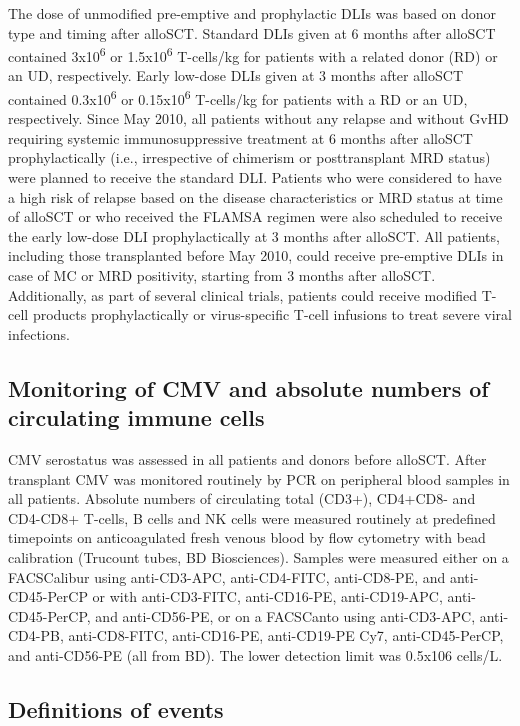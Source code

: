 \documentclass[
  letterpaper,
  paper=240mm:170mm,
  twoside=true,
  open=right,
  fontsize=10pt,
  pagesize=false,
  BCOR=15mm,
  DIV=14,
  headinclude=true,
  footinclude=false,
  headsepline=on]{scrbook}
\begin{document}
The dose of unmodified pre-emptive and prophylactic DLIs was based on
donor type and timing after alloSCT. Standard DLIs given at 6 months
after alloSCT contained 3x10\textsuperscript{6} or
1.5x10\textsuperscript{6} T-cells/kg for patients with a related donor
(RD) or an UD, respectively. Early low-dose DLIs given at 3 months after
alloSCT contained 0.3x10\textsuperscript{6} or
0.15x10\textsuperscript{6} T-cells/kg for patients with a RD or an UD,
respectively. Since May 2010, all patients without any relapse and
without GvHD requiring systemic immunosuppressive treatment at 6 months
after alloSCT prophylactically (i.e., irrespective of chimerism or
posttransplant MRD status) were planned to receive the standard DLI.
Patients who were considered to have a high risk of relapse based on the
disease characteristics or MRD status at time of alloSCT or who received
the FLAMSA regimen were also scheduled to receive the early low-dose DLI
prophylactically at 3 months after alloSCT. All patients, including
those transplanted before May 2010, could receive pre-emptive DLIs in
case of MC or MRD positivity, starting from 3 months after alloSCT.
Additionally, as part of several clinical trials, patients could receive
modified T-cell products prophylactically or virus-specific T-cell
infusions to treat severe viral infections.

\subsection{Monitoring of CMV and absolute numbers of circulating immune
cells}\label{monitoring-of-cmv-and-absolute-numbers-of-circulating-immune-cells}

CMV serostatus was assessed in all patients and donors before alloSCT.
After transplant CMV was monitored routinely by PCR on peripheral blood
samples in all patients. Absolute numbers of circulating total (CD3+),
CD4+CD8- and CD4-CD8+ T-cells, B cells and NK cells were measured
routinely at predefined timepoints on anticoagulated fresh venous blood
by flow cytometry with bead calibration (Trucount tubes, BD
Biosciences). Samples were measured either on a FACSCalibur using
anti-CD3-APC, anti-CD4-FITC, anti-CD8-PE, and anti-CD45-PerCP or with
anti-CD3-FITC, anti-CD16-PE, anti-CD19-APC, anti-CD45-PerCP, and
anti-CD56-PE, or on a FACSCanto using anti-CD3-APC, anti-CD4-PB,
anti-CD8-FITC, anti-CD16-PE, anti-CD19-PE Cy7, anti-CD45-PerCP, and
anti-CD56-PE (all from BD). The lower detection limit was 0.5x106
cells/L.

\subsection{Definitions of events}\label{definitions-of-events}
\end{document}
